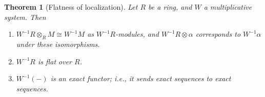 \documentclass{amsart}[12pt]
\numberwithin{equation}{section}
\theoremstyle{plain} %
\newtheorem{theorem}[equation]{Theorem}
\theoremstyle{definition}
\theoremstyle{remark}
\begin{document}
\begin{theorem}[Flatness of localization]
	Let $R$ be a ring, and $W$ a multiplicative system. Then
	\begin{enumerate}
		\item $W^{-1} R \otimes_R M \cong W^{-1}M$ as $W^{-1}R$-modules, and $W^{-1} R \otimes \alpha$ corresponds to $W^{-1}\alpha$ under these isomorphisms.
		\item $W^{-1}R$ is flat over $R$.
		\item $W^{-1}(-)$ is an exact functor; i.e., it sends exact sequences to exact sequences.
	\end{enumerate}
\end{theorem}
%		
%	
%
%
%	
%		
\end{document}
